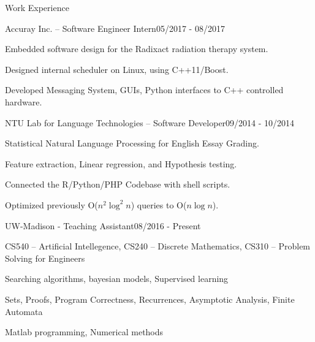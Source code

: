 \documentclass{resume} %
\begin{document}
\begin{rSection}{Work Experience}

    \begin{rSubsection}{Accuray Inc. -- Software Engineer Intern}{05/2017 - 08/2017}{}{}%
\item Embedded software design for the Radixact radiation therapy system.
\item Designed internal scheduler on Linux, using C++11/Boost.
\item Developed Messaging System, GUIs, Python interfaces to C++ controlled hardware. 
\end{rSubsection}

\begin{rSubsection}{NTU Lab for Language Technologies -- Software Developer}{09/2014 - 10/2014}{}{}%
\item Statistical Natural Language Processing for English Essay Grading.
\item Feature extraction, Linear regression, and Hypothesis testing.
\item Connected the R/Python/PHP Codebase with shell scripts.
\item Optimized previously O($n^2\log^2n$) queries to O($n\log n$).
\end{rSubsection}

\begin{rSubsection}{UW-Madison - Teaching Assistant}{08/2016 - Present}{}{}%
\item CS540 -- Artificial Intellegence, CS240 -- Discrete Mathematics, CS310 -- Problem Solving for Engineers
\item Searching algorithms, bayesian models, Supervised learning
\item Sets, Proofs, Program Correctness, Recurrences, Asymptotic Analysis, Finite Automata
\item Matlab programming, Numerical methods
\end{rSubsection}


\end{rSection}
\end{document}
